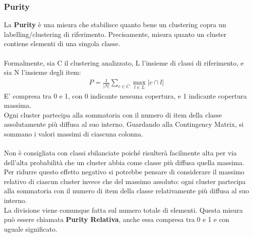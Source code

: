 \subsubsection{Purity}
La \textbf{Purity} è una misura che stabilisce quanto bene un clustering copra un labelling/clustering di riferimento. Precisamente, misura quanto un cluster contiene elementi di una singola classe.\\
\\
Formalmente, sia C il clustering analizzato, L l'insieme di classi di riferimento, e sia N l'insieme degli item:
\begin{align}
P = \frac{1}{|N|}\sum_{c \in C}\max_{l \in L}|c \cap l|
\end{align}
E' compresa tra 0 e 1, con 0 indicante nessuna copertura, e 1 indicante copertura massima.\\
Ogni cluster partecipa alla sommatoria con il numero di item della classe assolutamente più diffusa al suo interno. Guardando alla Contingency Matrix, si sommano i valori massimi di ciascuna colonna.\\
\\
Non è consigliata con classi sbilanciate poiché risulterà facilmente alta per via dell'alta probabilità che un cluster abbia come classe più diffusa quella massima.\\
Per ridurre questo effetto negativo si potrebbe pensare di considerare il massimo relativo di ciascun cluster invece che del massimo assoluto: ogni cluster partecipa alla sommatoria con il numero di item della classe relativamente più diffusa al suo interno.\\
La divisione viene comunque fatta sul numero totale di elementi. Questa misura può essere chiamata \textbf{Purity Relativa}, anche essa compresa tra 0 e 1 e con uguale significato.

